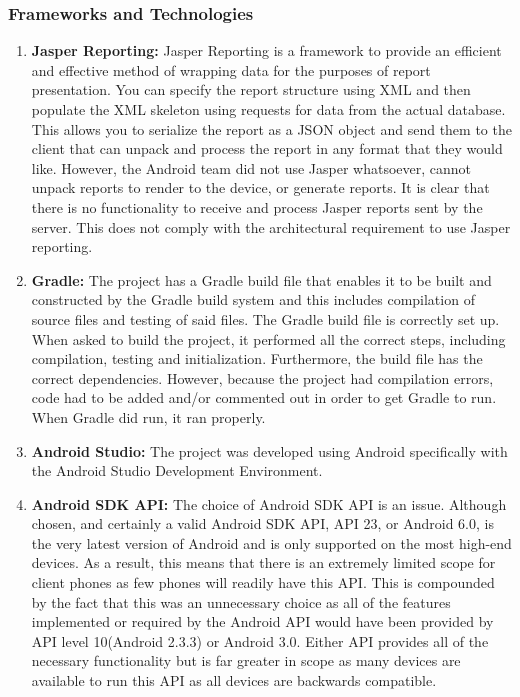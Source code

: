 \documentclass[a4paper,10pt]{article}
\begin{document}
    \subsubsection{Frameworks and Technologies}
    \begin{enumerate}
    	\item \textbf{Jasper Reporting: }Jasper Reporting is a framework to provide an efficient and effective method of wrapping data for the purposes of report presentation.
    	You can specify the report structure using XML and then populate the XML skeleton using requests for data from the actual database.
    	This allows you to serialize the report as a JSON object and send them to the client that can unpack and process the report in any format that they would like.
    	However, the Android team did not use Jasper whatsoever, cannot unpack reports to render to the device, or generate reports.
    	It is clear that there is no functionality to receive and process Jasper reports sent by the server.
    	This does not comply with the architectural requirement to use Jasper reporting.
    	\item \textbf{Gradle: } The project has a Gradle build file that enables it to be built and constructed by the Gradle build system and this includes compilation of source files and testing of said files.
    	The Gradle build file is correctly set up.
    	When asked to build the project, it performed all the correct steps, including compilation, testing and initialization.
    	Furthermore, the build file has the correct dependencies.
    	However, because the project had compilation errors, code had to be added and/or commented out in order to get Gradle to run.
    	When Gradle did run, it ran properly.
    	\item \textbf{Android Studio: } The project was developed using Android specifically with the Android Studio Development Environment.
    	\item \textbf{Android SDK API: } The choice of Android SDK API is an issue.
    	Although chosen, and certainly a valid Android SDK API, API 23, or Android 6.0, is the very latest version of Android and is only supported on the most high-end devices.
    	As a result, this means that there is an extremely limited scope for client phones as few phones will readily have this API.
    	This is compounded by the fact that this was an unnecessary choice as all of the features implemented or required by the Android API would have been provided by API level 10(Android 2.3.3) or Android 3.0.
    	Either API provides all of the necessary functionality but is far greater in scope as many devices are available to run this API as all devices are backwards compatible.

\end{enumerate}
\end{document}
